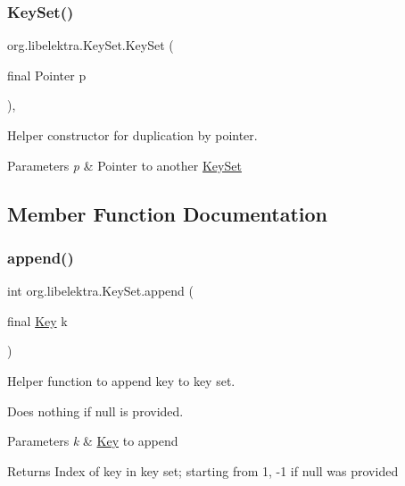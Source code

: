\subsubsection{\texorpdfstring{Key\+Set()}{KeySet()}\hspace{0.1cm}{\footnotesize\ttfamily [2/2]}}
{\footnotesize\ttfamily org.\+libelektra.\+Key\+Set.\+Key\+Set (\begin{DoxyParamCaption}\item[{final Pointer}]{p }\end{DoxyParamCaption})\hspace{0.3cm}{\ttfamily [inline]}, {\ttfamily [protected]}}



Helper constructor for duplication by pointer. 


\begin{DoxyParams}{Parameters}
{\em p} & Pointer to another \hyperlink{classorg_1_1libelektra_1_1KeySet}{Key\+Set} \\
\hline
\end{DoxyParams}


\subsection{Member Function Documentation}
\mbox{\label{classorg_1_1libelektra_1_1KeySet_a5c1738709f8ccda0929204c9151e773e}} 
\subsubsection{\texorpdfstring{append()}{append()}\hspace{0.1cm}{\footnotesize\ttfamily [1/2]}}
{\footnotesize\ttfamily int org.\+libelektra.\+Key\+Set.\+append (\begin{DoxyParamCaption}\item[{final \hyperlink{classorg_1_1libelektra_1_1Key}{Key}}]{k }\end{DoxyParamCaption})\hspace{0.3cm}{\ttfamily [inline]}}



Helper function to append key to key set. 

Does nothing if null is provided.


\begin{DoxyParams}{Parameters}
{\em k} & \hyperlink{classorg_1_1libelektra_1_1Key}{Key} to append \\
\hline
\end{DoxyParams}
\begin{DoxyReturn}{Returns}
Index of key in key set; starting from 1, -\/1 if null was provided 
\end{DoxyReturn}
\mbox{\label{classorg_1_1libelektra_1_1KeySet_a383722346ce590f7bc00aae82c1d035d}} 
